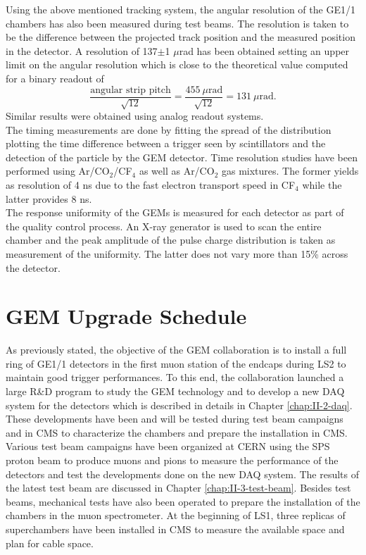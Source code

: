     Using the above mentioned tracking system, the angular resolution of the GE1/1 chambers has also been measured during test beams. The resolution is taken to be the difference between the projected track position and the measured position in the detector. A resolution of 137$\pm$1 $\mu$rad has been obtained setting an upper limit on the angular resolution which is close to the theoretical value computed for a binary readout of
    \begin{equation}
      \frac{\text{angular strip pitch}}{\sqrt{12}} = \frac{455\  \mu\text{rad}}{\sqrt{12}} = 131\ \mu\text{rad} .
    \end{equation}
    Similar results were obtained using analog readout systems. \\

    The timing measurements are done by fitting the spread of the distribution plotting the time difference between a trigger seen by scintillators and the detection of the particle by the GEM detector. Time resolution studies have been performed using Ar/CO$_2$/CF$_4$ as well as Ar/CO$_2$ gas mixtures. The former yields as resolution of 4 ns due to the fast electron transport speed in CF$_4$ while the latter provides 8 ns. \\

    The response uniformity of the GEMs is measured for each detector as part of the quality control process. An X-ray generator is used to scan the entire chamber and the peak amplitude of the pulse charge distribution is taken as measurement of the uniformity. The latter does not vary more than 15\% across the detector.

  \section{GEM Upgrade Schedule}

    As previously stated, the objective of the GEM collaboration is to install a full ring of GE1/1 detectors in the first muon station of the endcaps during LS2 to maintain good trigger performances. To this end, the collaboration launched a large R\&D program to study the GEM technology and to develop a new DAQ system for the detectors which is described in details in Chapter \ref{chap:II-2-daq}. These developments have been and will be tested during test beam campaigns and in CMS to characterize the chambers and prepare the installation in CMS. \\

    Various test beam campaigns have been organized at CERN using the SPS proton beam to produce muons and pions to measure the performance of the detectors and test the developments done on the new DAQ system. The results of the latest test beam are discussed in Chapter \ref{chap:II-3-test-beam}. Besides test beams, mechanical tests have also been operated to prepare the installation of the chambers in the muon spectrometer. At the beginning of LS1, three replicas of superchambers have been installed in CMS to measure the available space and plan for cable space. \\

